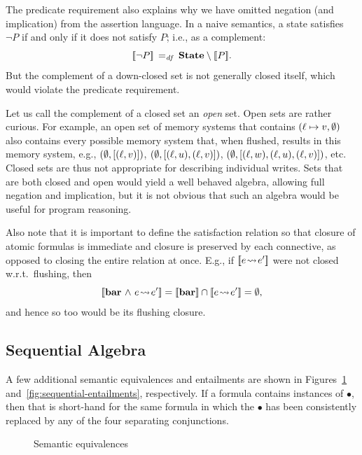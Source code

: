 \documentclass[11pt]{report}
\begin{document}
The predicate requirement also explains why we have omitted negation (and implication) from the assertion language. In a naive semantics, a state satisfies $\neg P$ if and only if it does not satisfy $P$; i.e., as a complement: \[ [\![\neg P]\!] \operatorname{\;=_{\mathit{df}}\;} \mathbf{State} \setminus [\![P]\!]. \] But the complement of a down-closed set is not generally closed itself, which would violate the predicate requirement. 

Let us call the complement of a closed set an \emph{open} set. Open sets are rather curious. For example, an open set of memory systems that contains $(\ell \mapsto v,\operatorname{\emptyset})$ also contains every possible memory system that, when flushed, results in this memory system, e.g., $(\operatorname{\emptyset}, \left[(\ell,v)\right])$, $(\operatorname{\emptyset}, \left[(\ell,u),(\ell,v)\right])$, $(\operatorname{\emptyset}, \left[(\ell,w),(\ell,u),(\ell,v)\right])$, etc. Closed sets are thus not appropriate for describing individual writes. Sets that are both closed and open would yield a well behaved algebra, allowing full negation and implication, but it is not obvious that such an algebra would be useful for program reasoning. 

Also note that it is important to define the satisfaction relation so that closure of atomic formulas is immediate and closure is preserved by each connective, as opposed to closing the entire relation at once. E.g., if $[\![e \!\leadsto\! e']\!]$ were not closed w.r.t.~flushing, then \[\pred{\fbaru \conj e \fwriteu e'} = \pred{\fbaru} \cap \pred{e \fwriteu e'} = \nil,\] and hence so too would be its flushing closure.  

\subsection{Sequential Algebra}
\label{sec:sequential-algebra}

A few additional semantic equivalences and entailments are shown in Figures~\ref{fig:sequential-equivalences} and~\ref{fig:sequential-entailments}, respectively. If a formula contains instances of $\bullet$, then that is short-hand for the same formula in which the $\bullet$ has been consistently replaced by any of the four separating conjunctions. 

\begin{figure}[ht]
    \centering
    \caption{\label{fig:sequential-equivalences}Semantic equivalences}
\end{figure}
\end{document}
